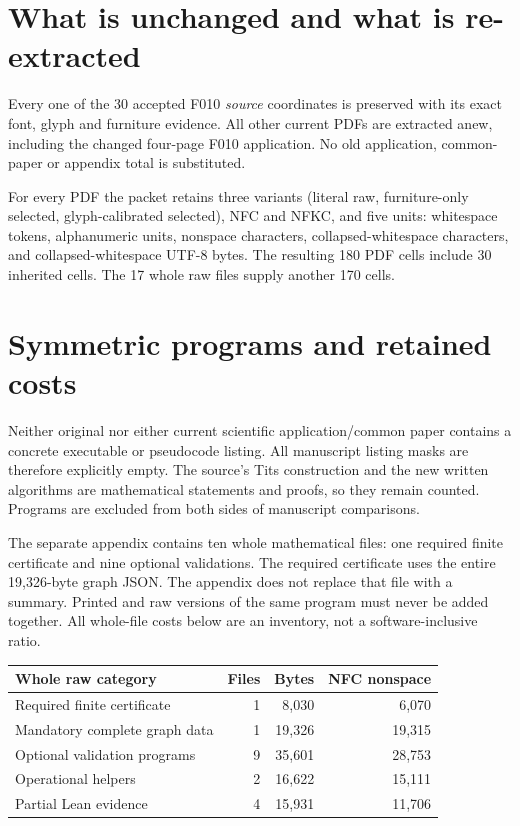 \documentclass[11pt]{article}
\begin{document}
\section*{What is unchanged and what is re-extracted}
Every one of the 30 accepted F010 \emph{source} coordinates is preserved with
its exact font, glyph and furniture evidence. All other current PDFs are
extracted anew, including the changed four-page F010 application. No old
application, common-paper or appendix total is substituted.

For every PDF the packet retains three variants (literal raw, furniture-only
selected, glyph-calibrated selected), NFC and NFKC, and five units: whitespace
tokens, alphanumeric units, nonspace characters, collapsed-whitespace
characters, and collapsed-whitespace UTF-8 bytes. The resulting 180 PDF cells
include 30 inherited cells. The 17 whole raw files supply another 170 cells.
\newpage
\section*{Symmetric programs and retained costs}
Neither original nor either current scientific application/common paper
contains a concrete executable or pseudocode listing. All manuscript listing
masks are therefore explicitly empty. The source's Tits construction and the
new written algorithms are mathematical statements and proofs, so they remain
counted. Programs are excluded from both sides of manuscript comparisons.

The separate appendix contains ten whole mathematical files: one required
finite certificate and nine optional validations. The required certificate
uses the entire 19,326-byte graph JSON. The appendix does not replace that
file with a summary. Printed and raw versions of the same program must never
be added together. All whole-file costs below are an inventory, not a
software-inclusive ratio.

\begin{center}\small
\begin{tabular}{lrrr}\toprule
Whole raw category & Files & Bytes & NFC nonspace\\\midrule
Required finite certificate & 1 & 8,030 & 6,070 \\
Mandatory complete graph data & 1 & 19,326 & 19,315 \\
Optional validation programs & 9 & 35,601 & 28,753 \\
Operational helpers & 2 & 16,622 & 15,111 \\
Partial Lean evidence & 4 & 15,931 & 11,706 \\
\bottomrule\end{tabular}\end{center}
\end{document}
